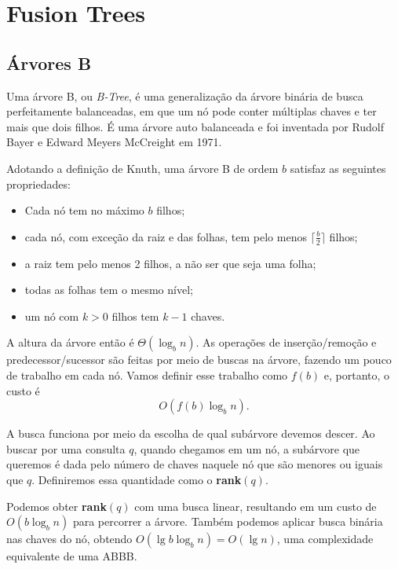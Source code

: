 \chapter{Fusion Trees}
\label{cap:fusion}

\section{Árvores B}

Uma árvore B, ou \textit{B-Tree}, é uma generalização da árvore binária de busca
perfeitamente balanceadas, em que um nó pode conter múltiplas chaves e ter mais
que dois filhos. É uma árvore auto balanceada e foi inventada por Rudolf Bayer e
Edward Meyers McCreight em 1971. 

Adotando a definição de Knuth, uma árvore B de ordem $b$ satisfaz as seguintes
propriedades:
\begin{itemize}
\item Cada nó tem no máximo $b$ filhos;
\item cada nó, com exceção da raiz e das folhas, tem pelo menos $\lceil
\frac{b}{2} \rceil$ filhos;
\item a raiz tem pelo menos 2 filhos, a não ser que seja uma folha;
\item todas as folhas tem o mesmo nível;
\item um nó com $k > 0$ filhos tem $k-1$ chaves.
\end{itemize}

A altura da árvore então é $\Theta(\log_b n)$. As operações de inserção/remoção
e predecessor/sucessor são feitas por meio de buscas na árvore, fazendo um pouco
de trabalho em cada nó. Vamos definir esse trabalho como $f(b)$ e, portanto, o
custo é 
\[
O(f(b) \log_b n).
\]

A busca funciona por meio da escolha de qual subárvore devemos descer. Ao buscar
por uma consulta $q$, quando chegamos em um nó, a subárvore que queremos é dada
pelo número de chaves naquele nó que são menores ou iguais que $q$. Definiremos
essa quantidade como o \textbf{rank}$(q)$. 

Podemos obter \textbf{rank}$(q)$ com uma busca linear, resultando em um custo de
$O(b \log_b n)$ para percorrer a árvore. Também podemos aplicar busca binária
nas chaves do nó, obtendo $O(\lg b \log_b n)=O(\lg n)$, uma complexidade
equivalente de uma ABBB.

